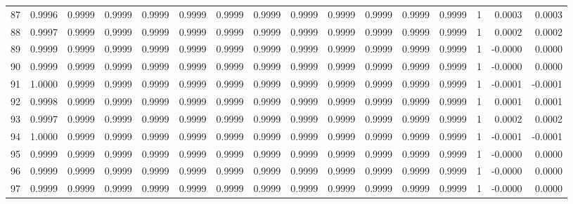 \begin{tabular}{lrrrrrrrrrrrrrrr}
87  &      0.9996 &  0.9999 &  0.9999 &  0.9999 &  0.9999 &  0.9999 &  0.9999 &  0.9999 &  0.9999 &  0.9999 &   0.9999 &     0.9999 &      1 &                    0.0003 &                     0.0003 \\
88  &      0.9997 &  0.9999 &  0.9999 &  0.9999 &  0.9999 &  0.9999 &  0.9999 &  0.9999 &  0.9999 &  0.9999 &   0.9999 &     0.9999 &      1 &                    0.0002 &                     0.0002 \\
89  &      0.9999 &  0.9999 &  0.9999 &  0.9999 &  0.9999 &  0.9999 &  0.9999 &  0.9999 &  0.9999 &  0.9999 &   0.9999 &     0.9999 &      1 &                   -0.0000 &                     0.0000 \\
90  &      0.9999 &  0.9999 &  0.9999 &  0.9999 &  0.9999 &  0.9999 &  0.9999 &  0.9999 &  0.9999 &  0.9999 &   0.9999 &     0.9999 &      1 &                   -0.0000 &                     0.0000 \\
91  &      1.0000 &  0.9999 &  0.9999 &  0.9999 &  0.9999 &  0.9999 &  0.9999 &  0.9999 &  0.9999 &  0.9999 &   0.9999 &     0.9999 &      1 &                   -0.0001 &                    -0.0001 \\
92  &      0.9998 &  0.9999 &  0.9999 &  0.9999 &  0.9999 &  0.9999 &  0.9999 &  0.9999 &  0.9999 &  0.9999 &   0.9999 &     0.9999 &      1 &                    0.0001 &                     0.0001 \\
93  &      0.9997 &  0.9999 &  0.9999 &  0.9999 &  0.9999 &  0.9999 &  0.9999 &  0.9999 &  0.9999 &  0.9999 &   0.9999 &     0.9999 &      1 &                    0.0002 &                     0.0002 \\
94  &      1.0000 &  0.9999 &  0.9999 &  0.9999 &  0.9999 &  0.9999 &  0.9999 &  0.9999 &  0.9999 &  0.9999 &   0.9999 &     0.9999 &      1 &                   -0.0001 &                    -0.0001 \\
95  &      0.9999 &  0.9999 &  0.9999 &  0.9999 &  0.9999 &  0.9999 &  0.9999 &  0.9999 &  0.9999 &  0.9999 &   0.9999 &     0.9999 &      1 &                   -0.0000 &                     0.0000 \\
96  &      0.9999 &  0.9999 &  0.9999 &  0.9999 &  0.9999 &  0.9999 &  0.9999 &  0.9999 &  0.9999 &  0.9999 &   0.9999 &     0.9999 &      1 &                   -0.0000 &                     0.0000 \\
97  &      0.9999 &  0.9999 &  0.9999 &  0.9999 &  0.9999 &  0.9999 &  0.9999 &  0.9999 &  0.9999 &  0.9999 &   0.9999 &     0.9999 &      1 &                   -0.0000 &                     0.0000 \\

\end{tabular}

